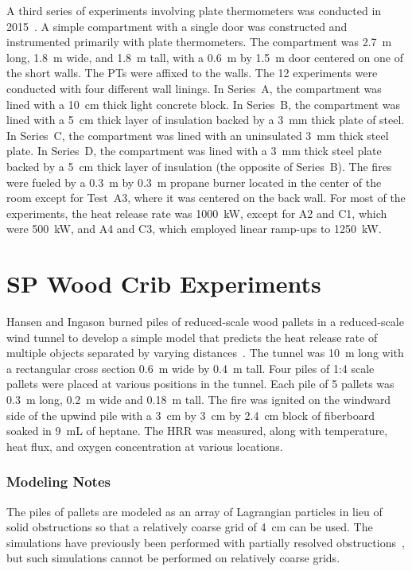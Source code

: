 A third series of experiments involving plate thermometers was conducted in 2015~\cite{Sjostrom:SP2016}. A simple compartment with a single door was constructed and instrumented primarily with plate thermometers. The compartment was 2.7~m long, 1.8~m wide, and 1.8~m tall, with a 0.6~m by 1.5~m door centered on one of the short walls. The PTs were affixed to the walls. The 12 experiments were conducted with four different wall linings. In Series~A, the compartment was lined with a 10~cm thick light concrete block. In Series~B, the compartment was lined with a 5~cm thick layer of insulation backed by a 3~mm thick plate of steel. In Series~C, the compartment was lined with an uninsulated 3~mm thick steel plate. In Series~D, the compartment was lined with a 3~mm thick steel plate backed by a 5~cm thick layer of insulation (the opposite of Series~B). The fires were fueled by a 0.3~m by 0.3~m propane burner located in the center of the room except for Test~A3, where it was centered on the back wall. For most of the experiments, the heat release rate was 1000~kW, except for A2 and C1, which were 500~kW, and A4 and C3, which employed linear ramp-ups to 1250~kW.


\section{SP Wood Crib Experiments}
\label{SP_Wood_Cribs_Description}

Hansen and Ingason burned piles of reduced-scale wood pallets in a reduced-scale wind tunnel to develop a simple model that predicts the heat release rate of multiple objects separated by varying distances~\cite{Hansen:2010,Hansen:FSJ2012}. The tunnel was 10~m long with a rectangular cross section 0.6~m wide by 0.4~m tall. Four piles of 1:4 scale pallets were placed at various positions in the tunnel. Each pile of 5 pallets was 0.3~m long, 0.2~m wide and 0.18~m tall. The fire was ignited on the windward side of the upwind pile with a 3~cm by 3~cm by 2.4~cm block of fiberboard soaked in 9~mL of heptane. The HRR was measured, along with temperature, heat flux, and oxygen concentration at various locations.

\subsubsection{Modeling Notes}

The piles of pallets are modeled as an array of Lagrangian particles in lieu of solid obstructions so that a relatively coarse grid of 4~cm can be used. The simulations have previously been performed with partially resolved obstructions~\cite{Janardhan:FT2019}, but such simulations cannot be performed on relatively coarse grids.

